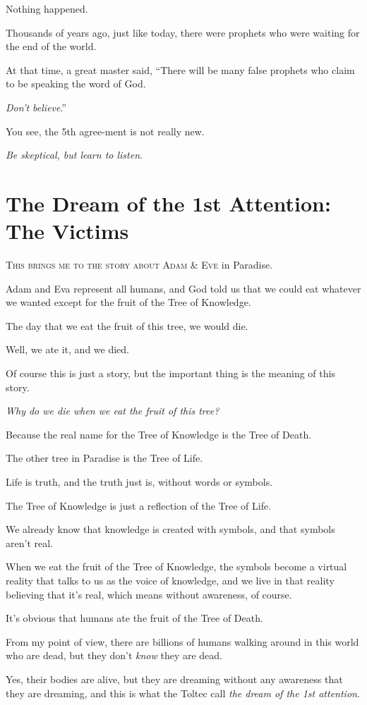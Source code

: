 \documentclass{article}
\numberwithin{equation}{section}
\begin{document}
Nothing happened.

%
Thousands of years ago, just like today, there were prophets who were waiting for the end of the world.

At that time, a great master said, ``There will be many false prophets who claim to be speaking the word of God.

\textit{Don't believe}.''

You see, the 5th agree-ment is not really new.

\textit{Be skeptical, but learn to listen}.

\section{The Dream of the 1st Attention: The Victims}
\textsc{This brings me to the story about Adam \& Eve} in Paradise.

Adam and Eva represent all humans, and God told us that we could eat whatever we wanted except for the fruit of the Tree of Knowledge.

The day that we eat the fruit of this tree, we would die.

Well, we ate it, and we died.

%
Of course this is just a story, but the important thing is the meaning of this story.

\textit{Why do we die when we eat the fruit of this tree?}

Because the real name for the Tree of Knowledge is the Tree of Death.

The other tree in Paradise is the Tree of Life.

Life is truth, and the truth just is, without words or symbols.

The Tree of Knowledge is just a reflection of the Tree of Life.

We already know that knowledge is created with symbols, and that symbols aren't real.

When we eat the fruit of the Tree of Knowledge, the symbols become a virtual reality that talks to us as the voice of knowledge, and we live in that reality believing that it's real, which means without awareness, of course.

%
It's obvious that humans ate the fruit of the Tree of Death.

From my point of view, there are billions of humans walking around in this world who are dead, but they don't \textit{know} they are dead.

Yes, their bodies are alive, but they are dreaming without any awareness that they are dreaming, and this is what the Toltec call \textit{the dream of the 1st attention}.
\end{document}

